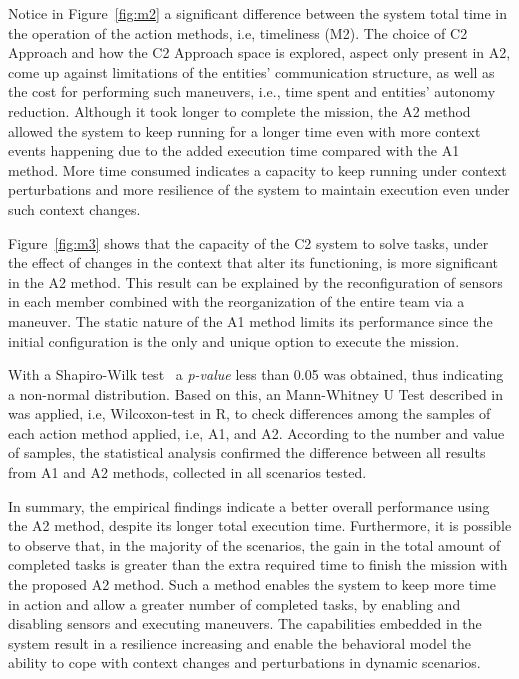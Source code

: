 Notice in Figure~\ref{fig:m2} a significant difference between the system total time in the operation of the action methods, i.e, timeliness (M2). The choice of C2 Approach and how the C2 Approach space is explored, aspect only present in A2, come up against limitations of the entities' communication structure, as well as the cost for performing such maneuvers, i.e., time spent and entities' autonomy reduction. Although it took longer to complete the mission, the A2 method allowed the system to keep running for a longer time even with more context events happening due to the added execution time compared with the A1 method. More time consumed indicates a capacity to keep running under context perturbations and more resilience of the system to maintain execution even under such context changes. 

Figure~\ref{fig:m3} shows that the capacity of the C2 system to solve tasks, under the effect of changes in the context that alter its functioning, is more significant in the A2 method. This result can be explained by the reconfiguration of sensors in each member combined with the reorganization of the entire team via a maneuver. The static nature of the A1 method limits its performance since the initial configuration is the only and unique option to execute the mission.

With a Shapiro-Wilk test~\citep{stat001} a \textit{p-value} less than 0.05 was obtained, thus indicating a non-normal distribution. Based on this, an Mann-Whitney U Test described in~\cite{stat002} was applied, i.e, Wilcoxon-test in R, to check differences among the samples of each action method applied, i.e, A1, and A2. According to the number and value of samples, the statistical analysis confirmed the difference between all results from A1 and A2 methods, collected in all scenarios tested.

In summary, the empirical findings indicate a better overall performance using the A2 method, despite its longer total execution time. Furthermore, it is possible to observe that, in the majority of the scenarios, the gain in the total amount of completed tasks is greater than the extra required time to finish the mission with the proposed A2 method. Such a method enables the system to keep more time in action and allow a greater number of completed tasks, by enabling and disabling sensors and executing maneuvers. The capabilities embedded in the system result in a resilience increasing and enable the behavioral model the ability to cope with context changes and perturbations in dynamic scenarios.